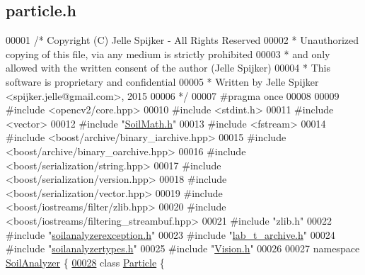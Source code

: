 \hypertarget{particle_8h_source}{}\subsection{particle.\+h}
\label{particle_8h_source}

\begin{DoxyCode}
00001 \textcolor{comment}{/* Copyright (C) Jelle Spijker - All Rights Reserved}
00002 \textcolor{comment}{ * Unauthorized copying of this file, via any medium is strictly prohibited}
00003 \textcolor{comment}{ * and only allowed with the written consent of the author (Jelle Spijker)}
00004 \textcolor{comment}{ * This software is proprietary and confidential}
00005 \textcolor{comment}{ * Written by Jelle Spijker <spijker.jelle@gmail.com>, 2015}
00006 \textcolor{comment}{ */}
00007 \textcolor{preprocessor}{#pragma once}
00008 
00009 \textcolor{preprocessor}{#include <opencv2/core.hpp>}
00010 \textcolor{preprocessor}{#include <stdint.h>}
00011 \textcolor{preprocessor}{#include <vector>}
00012 \textcolor{preprocessor}{#include "\hyperlink{_soil_math_8h}{SoilMath.h}"}
00013 \textcolor{preprocessor}{#include <fstream>}
00014 \textcolor{preprocessor}{#include <boost/archive/binary\_iarchive.hpp>}
00015 \textcolor{preprocessor}{#include <boost/archive/binary\_oarchive.hpp>}
00016 \textcolor{preprocessor}{#include <boost/serialization/string.hpp>}
00017 \textcolor{preprocessor}{#include <boost/serialization/version.hpp>}
00018 \textcolor{preprocessor}{#include <boost/serialization/vector.hpp>}
00019 \textcolor{preprocessor}{#include <boost/iostreams/filter/zlib.hpp>}
00020 \textcolor{preprocessor}{#include <boost/iostreams/filtering\_streambuf.hpp>}
00021 \textcolor{preprocessor}{#include "zlib.h"}
00022 \textcolor{preprocessor}{#include "\hyperlink{soilanalyzerexception_8h}{soilanalyzerexception.h}"}
00023 \textcolor{preprocessor}{#include "\hyperlink{lab__t__archive_8h}{lab\_t\_archive.h}"}
00024 \textcolor{preprocessor}{#include "\hyperlink{soilanalyzertypes_8h}{soilanalyzertypes.h}"}
00025 \textcolor{preprocessor}{#include "\hyperlink{_vision_8h}{Vision.h}"}
00026 
00027 \textcolor{keyword}{namespace }\hyperlink{namespace_soil_analyzer}{SoilAnalyzer} \{
\hypertarget{particle_8h_source_l00028}{}\hyperlink{class_soil_analyzer_1_1_particle}{00028} \textcolor{keyword}{class }\hyperlink{class_soil_analyzer_1_1_particle}{Particle} \{

\end{DoxyCode}
